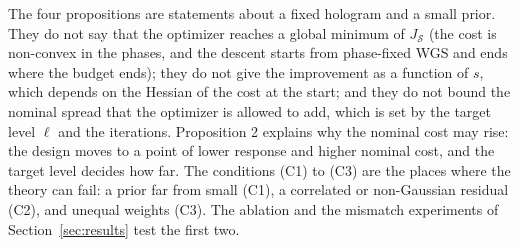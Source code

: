 The four propositions are statements about a fixed hologram and a small prior. They do not say that the optimizer reaches a global minimum of $J_{\mathcal S}$ (the cost is non-convex in the phases, and the descent starts from phase-fixed WGS and ends where the budget ends); they do not give the improvement as a function of $s$, which depends on the Hessian of the cost at the start;
and they do not bound the nominal spread that the optimizer is allowed to add, which is set by the target level $\ell$ and the iterations. Proposition 2 explains why the nominal cost may rise: the design moves to a point of lower response and higher nominal cost, and the target level decides how far. The conditions (C1) to (C3) are the places where the
theory can fail: a prior far from small (C1), a correlated or non-Gaussian residual (C2), and unequal weights (C3). The ablation and the mismatch experiments of Section~\ref{sec:results} test the first two.
